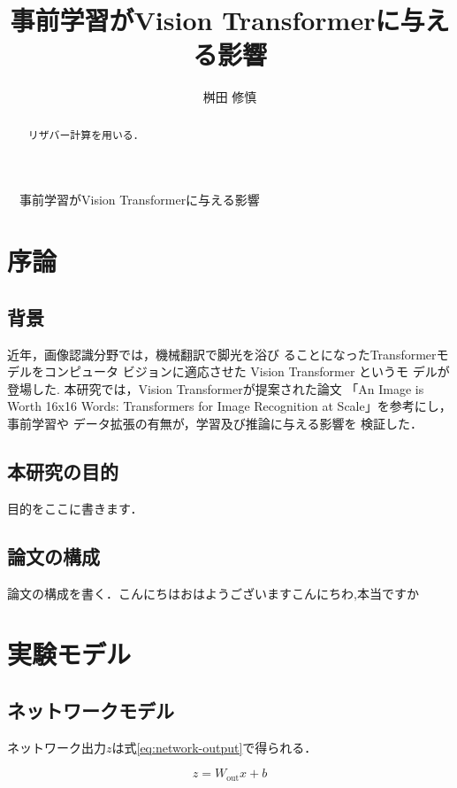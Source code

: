 \documentclass[a4paper, oneside, openany, dvipdfmx]{suribt}%
\title{事前学習がVision Transformerに与える影響}
\author{桝田 修慎}
\newcommand{\eref}[1]{式\eqref{#1}}
\begin{document}
\maketitle%
　事前学習がVision Transformerに与える影響

\frontmatter%
\begin{abstract}%
  リザバー計算\cite{jaeger2004harnessing,maass2002real}を用いる．
\end{abstract}

\tableofcontents%


\mainmatter%
\chapter{序論}
\section{背景}
近年，画像認識分野では，機械翻訳で脚光を浴び
ることになったTransformer\cite{dosovitskiy2021image}モデルをコンピュータ ビジョンに適応させた Vision Transformer というモ デルが登場した.
本研究では，Vision Transformerが提案された論文
「An Image is Worth 16x16 Words: Transformers for Image Recognition at Scale」を参考にし，事前学習や データ拡張の有無が，学習及び推論に与える影響を 検証した．
\section{本研究の目的}
目的をここに書きます．
\section{論文の構成}
論文の構成を書く．こんにちはおはようございますこんにちわ\cite{魚住春日2020mask},本当ですか


\chapter{実験モデル}
\section{ネットワークモデル}
ネットワーク出力$z$は\eref{eq:network-output}で得られる．

\begin{equation}
  z = W_\mathrm{out} x + b
  \label{eq:network-output}
\end{equation}
\end{document}
